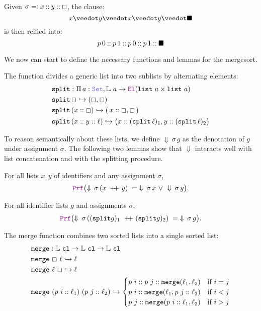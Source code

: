 \begin{example}[Reification]
Given $\sigma \eqcolon x \mathbin{::} y \mathbin{::} \Box$, the clause:
\[
    x \veedot y \veedot x \veedot y \veedot \nil 
\]
is then reified into:
\[
    p\,0 \mathbin{::} p\,1 \mathbin{::} p\,0 \mathbin{::} p\,1 \mathbin{::} \blacksquare
\]
\end{example}

We now can start to define the necessary functions and lemmas for the mergesort.

\begin{definition}[split]\label{def:split}
The function  divides a generic list into two sublists by alternating elements:
\begin{align*}
&\kw{split}: \Pi\,a:\set, \bb{L}~a \ra \el (\kw{list}~a \times \kw{list}~a)\\
&\kw{split}\,\Box \re (\Box , \Box) \\
&\kw{split}\,(x::\Box) \re (\,x::\Box , \Box\,) \\
&\kw{split}\,(x::y::\ell) \re \bigl(x::(\kw{split}\,\ell)_1, y::(\kw{split}\,\ell)_2 \bigr)
\end{align*}
\end{definition}

To reason semantically about these lists, we define $\Downarrow\,\sigma\,g$ as the denotation of $g$ under assignment $\sigma$.  
The following two lemmas show that $\Downarrow$ interacts well with list concatenation and with the splitting procedure.


\begin{lemma}\label{lem:den-cat}
For all lists \(x,y\) of identifiers and any assignment \(\sigma\),
\[
\prf\bigl(\Downarrow\,\sigma\,(x \concat y) \;=\; \Downarrow\,\sigma\,x \ \vee\ \Downarrow\,\sigma\,y\bigr).
\]
\end{lemma}

\begin{lemma}\label{lem:split-correct}
For all identifier lists \(g\) and assignments \(\sigma\),
\[
  \prf\bigl(\Downarrow\,\sigma\,((\kw{split} g)_1 \concat (\kw{split} g)_2) \;=\; \Downarrow\,\sigma\,g\bigr).
\]
\end{lemma}

\begin{definition}[merge]
The merge function combines two sorted lists into a single sorted list:
\begin{align*}
& \texttt{\upshape{merge}}: \mathbb{L}~\texttt{\upshape{cl}} \rightarrow \mathbb{L}~\texttt{\upshape{cl}} \rightarrow \mathbb{L}~\texttt{\upshape{cl}} \\
&\texttt{\upshape{merge}}~\Box~\ell \hookrightarrow \ell \\
&\texttt{\upshape{merge}}~\ell~\Box \hookrightarrow \ell \\
&\texttt{\upshape{merge}}~(p~i :: \ell_1)~(p~j::\ell_2) \hookrightarrow
\begin{cases}
p~i :: p~j :: \texttt{\upshape{merge}}(\ell_1,\ell_2) & \text{if } i = j \\
p~i :: \texttt{\upshape{merge}}(\ell_1, p~j::\ell_2) & \text{if } i < j \\
p~j :: \texttt{\upshape{merge}}(p~i::\ell_1, \ell_2) & \text{if } i > j
\end{cases}
\end{align*}
\end{definition}

